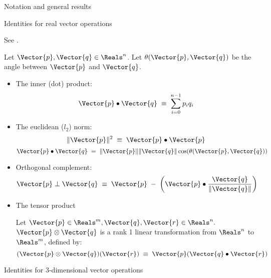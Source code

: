 \begin{plSection}{Notation and general results}
\label{sec:general}
\begin{plSection}{Identities for real vector operations}
\label{sec:RX}

See .

Let $\Vector{p}, \Vector{q} \in \Reals^{n}$.
Let $\theta(\Vector{p},\Vector{q})$ be the angle between $\Vector{p}$ and $\Vector{q}$.

\begin{itemize}
\item The inner (dot) product:
\begin{equation}
\Vector{p} \bullet \Vector{q} \; \equiv \; \sum_{i=0}^{n-1} p_i q_i
\end{equation}

\item The euclidean ($l_2$) norm:
\begin{equation}
\| \Vector{p} \|^2 \; \equiv \; \Vector{p} \bullet \Vector{p}
\end{equation}
\begin{equation}
\Vector{p} \bullet \Vector{q} \; = \; \| \Vector{p} \| \| \Vector{q} \| \cos(\theta(\Vector{p},\Vector{q}))
\end{equation}

\item Orthogonal complement:
\begin{equation}
\Vector{p} \perp \Vector{q} 
\; \equiv \; \Vector{p} 
\; - \; 
\left( 
\Vector{p} \bullet 
\frac{\Vector{q}}{\|\Vector{q}\|}
\right) 
\end{equation}

\item The tensor product

Let $\Vector{p} \in \Reals^m, \Vector{q}, \Vector{r} \in \Reals^n.$
$\Vector{p} \otimes \Vector{q}$ is a rank 1 linear transformation
from $\Reals^n$ to $\Reals^m$, defined by:
\begin{equation}
(\Vector{p} \otimes \Vector{q})(\Vector{r}) \; \equiv \; \Vector{p} (\Vector{q} \bullet \Vector{r})
\end{equation}

\end{itemize}

\end{plSection}%
\begin{plSection}{Identities for 3-dimensional vector operations}
\label{sec:R3X}


\end{plSection}
\end{plSection}
